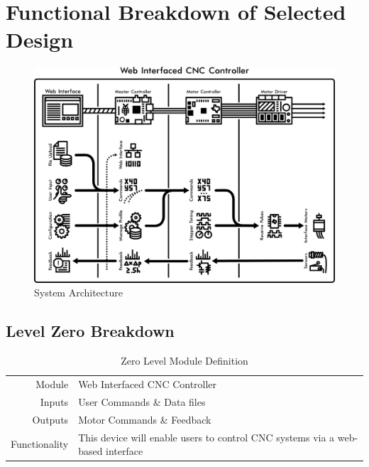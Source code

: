 \chapter{Functional Breakdown of Selected Design}

\begin{figure}[h]
	\centering
	\includegraphics[width=1\textwidth]{architecture.png}
	\caption{System Architecture}
	\label{fig:architecture}
\end{figure}

\section{Level Zero Breakdown}
\begin{table}[H] 
	\caption{Zero Level Module Definition}
	\label{table:zerolevel}
	\centering 
	\begin{tabular}{|r p{10cm}|} 
		\hline\hline
		Module		& Web Interfaced CNC Controller \\ 
		Inputs		& User Commands \& Data files 	\\ 
		Outputs		& Motor Commands \& Feedback	\\ 
		Functionality	& This device will enable users to control CNC systems via a web-based interface 	\\ 
		\hline
		\end{tabular} 
\end{table}

